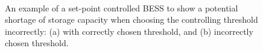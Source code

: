 \begin{figure}\centering
	\\
	\caption{An example of a set-point controlled BESS to show a potential shortage of storage capacity when choosing the controlling threshold incorrectly: (a) with correctly chosen threshold, and (b) incorrectly chosen threshold.}
	\label{ch-literature:fig:spc}
\end{figure}